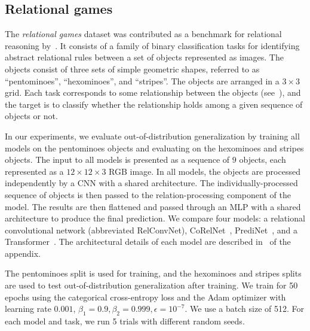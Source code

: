 \subsection{Relational games}\label{ssec:exp_relational_games}

The \textit{relational games} dataset was contributed as a benchmark for relational reasoning by~\citep{shanahanExplicitlyRelationalNeural}. It consists of a family of binary classification tasks for identifying abstract relational rules between a set of objects represented as images. The objects consist of three sets of simple geometric shapes, referred to as ``pentominoes'', ``hexominoes'', and ``stripes''. The objects are arranged in a $3 \times 3$ grid. Each task corresponds to some relationship between the objects (see~), and the target is to classify whether the relationship holds among a given sequence of objects or not.

In our experiments, we evaluate out-of-distribution generalization by training all models on the pentominoes objects and evaluating on the hexominoes and stripes objects. The input to all models is presented as a sequence of $9$ objects, each represented as a $12 \times 12 \times 3$ RGB image. In all models, the objects are processed independently by a CNN with a shared architecture. The individually-processed sequence of objects is then passed to the relation-processing component of the model. The results are then flattened and passed through an MLP with a shared architecture to produce the final prediction. We compare four models: a relational convolutional network (abbreviated RelConvNet), CoRelNet~\citep{kergNeuralArchitecture2022}, PrediNet~\citep{shanahanExplicitlyRelationalNeural}, and a Transformer~\citep{vaswani2017attention}. The architectural details of each model are described in~ of the appendix.

The pentominoes split is used for training,
and the hexominoes and stripes splits are used to test out-of-distribution generalization after training. We train for 50 epochs using the categorical cross-entropy loss and the Adam optimizer with learning rate $0.001$, $\beta_1 = 0.9, \beta_2 = 0.999, \epsilon = 10^{-7}$. We use a batch size of 512. For each model and task, we run 5 trials with different random seeds.

